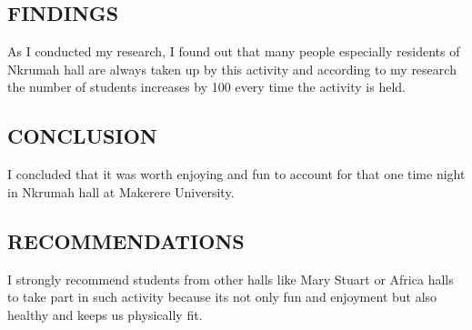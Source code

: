 \documentclass[10pt]{report}
\begin{document}
\subsection{FINDINGS}
{As I conducted my research, I found out that many people especially residents of Nkrumah hall are always taken up by this activity and according to my research the number of students increases by 100 every time the activity is held.}

\subsection{CONCLUSION}
{I concluded that it was worth enjoying and fun to account for that one time night in Nkrumah hall at Makerere University.}
\subsection{RECOMMENDATIONS}
{I strongly recommend students from other halls like Mary Stuart or Africa halls to take part in such activity because its not only fun and enjoyment but also healthy and keeps us physically fit.}
 
\end{document}
